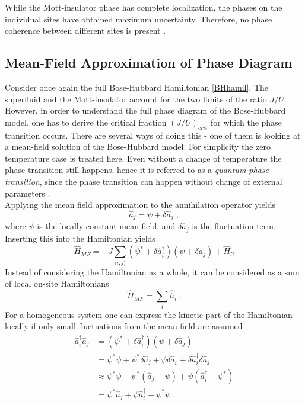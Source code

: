 While the Mott-insulator phase has complete localization, the phases on the individual sites have obtained maximum uncertainty. Therefore, no phase coherence between different sites is present \cite{greiner}.


\subsection{Mean-Field Approximation of Phase Diagram} \label{sec:MeanFieldDiagram}
Consider once again the full Bose-Hubbard Hamiltonian \eqref{BHhamil}. The superfluid and the Mott-insulator account for the two limits of the ratio $J/U$. However, in order to understand the full phase diagram of the Bose-Hubbard model, one has to derive the critical fraction $(J/U)_{crit}$ for which the phase transition occurs. There are several ways of doing this - one of them is looking at a mean-field solution of the Bose-Hubbard model. For simplicity the zero temperature case is treated here. Even without a change of temperature the phase transition still happens, hence it is referred to as a \textit{quantum phase transition}, since the phase transition can happen without change of external parameters \cite{Sachdev2007QPT}.\\
Applying the mean field approximation to the annihilation operator yields
\begin{equation}
	\hat{a}_j = \psi + \delta \hat{a}_j \; ,
\end{equation}
where $\psi$ is the locally constant mean field, and $\delta \hat{a}_j$ is the fluctuation term. Inserting this into the Hamiltonian yields
\begin{equation}
	\hat{H}_{MF} = -J \sum_{\langle i,j \rangle} \left( \psi^* + \delta \hat{a}_{i}^{\dag} \right) \left( \psi + \delta \hat{a}_{j} \right) + \hat{H}_U
\end{equation}
Instead of considering the Hamiltonian as a whole, it can be considered as a sum of local on-site Hamiltonians
\begin{equation}
	\hat{H}_{MF} = \sum_{i} \hat{h}_i \; .
\end{equation}
For a homogeneous system one can express the kinetic part of the Hamiltonian locally if only small fluctuations from the mean field are assumed
\begin{align}
  \hat{a}_{i}^{\dag} \hat{a}_{j} &= \left( \psi^* + \delta \hat{a}_{i}^{\dag} \right) \left( \psi + \delta \hat{a}_{j} \right) \nonumber \\
  &= \psi^* \psi + \psi^* \delta \hat{a}_j + \psi \delta \hat{a}_{i}^{\dag} + \delta \hat{a}_{i}^{\dag} \delta \hat{a}_{j} \nonumber \\
  & \approx \psi^* \psi + \psi^* \left( \hat{a}_j - \psi \right) + \psi \left( \hat{a}_{i}^{\dag} - \psi^* \right) \nonumber \\
&= \psi^* \hat{a}_j + \psi \hat{a}_{i}^{\dag} - \psi^* \psi \; .
\end{align}
